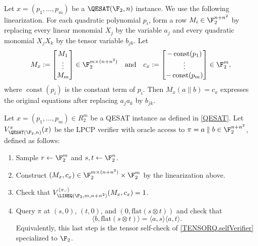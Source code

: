 

Let \(x=(p_1,\dots,p_m)\) be a \(\QESAT(\F_2,n)\) instance. We use the following
linearization. For each quadratic
polynomial \(p_i\), form a row \(M_i\in\F_2^{n+n^2}\) by replacing every
linear monomial \(X_j\) by the variable \(a_j\) and every quadratic monomial
\(X_jX_k\) by the tensor variable \(b_{jk}\). Let
    \[
    M_{x} := \begin{bmatrix} M_1 \\ \vdots \\ M_m \end{bmatrix} \in \F_2^{m \times (n+n^2)} 
    \quad \text{and} \quad 
    c_{x} := \begin{bmatrix} -\operatorname{const}(p_1) \\ \vdots \\ -\operatorname{const}(p_m) \end{bmatrix} \in \F_2^m,
    \]
where \(\operatorname{const}(p_i)\) is the constant term of \(p_i\).
Then \(M_{x}(a\parallel b)=c_{x}\) expresses the original equations after
replacing \(a_ja_k\) by \(b_{jk}\).

\begin{definition}
\label{QESAT.verifier}
\leanok
Let \(x=(p_1,\dots,p_m) \in R_{2}^{m}\) be a QESAT instance as defined in \ref{QESAT}. Let \(V_{\QESAT(\F_2,n)}^{\pi}(x)\) be the LPCP verifier 
with oracle access to \(\pi=a\parallel b\in\F_2^{n+n^2}\), defined as follows:
\begin{enumerate}
  \item Sample $r \gets \F_{2}^m$ and $s, t \gets \F_{2}^n$.
  \item Construct \((M_{x},c_{x}) \in \F_2^{m \times (n+n^2)} \times \F_2^m\) by the linearization above.
  \item Check that \(V_{\LINEQ(\F_2,m,n+n^2)}^{\langle \pi, \cdot \rangle } (M_{x},c_{x}) = 1\).
  \item Query \(\pi\) at
  \((s,0)\), \((t,0)\), and \((0,\mathrm{flat}(s\otimes t))\) and check that
  \[
    \langle b,\mathrm{flat}(s\otimes t)\rangle
    =\langle a,s\rangle\langle a,t\rangle .
  \]
  Equivalently, this last step is the tensor self-check of \ref{TENSORQ.selfVerifier} specialized to \(\F_2\).
\end{enumerate}
\end{definition}

